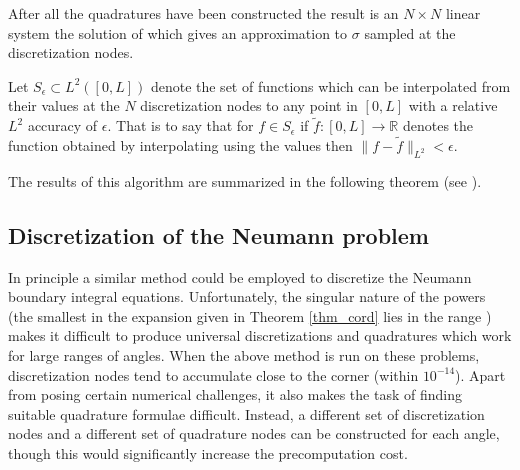 After all the quadratures have been constructed the result is an $N \times N$ linear system the  solution of which gives an approximation to $\sigma$ sampled at the discretization nodes. 

\begin{definition}\label{def:seps}
Let $S_\epsilon \subset L^2([0,L])$ denote the set of functions which can be interpolated from their values at the $N$ discretization nodes to any point in $[0,L]$ with a relative $L^2$ accuracy of $\epsilon.$ That is to say that for $f \in S_\epsilon$ if $\tilde{f}:[0,L] \to \mathbb{R}$ denotes the function obtained by interpolating using the values  then $\|f -\tilde{f}\|_{L^2} < \epsilon.$ 
\end{definition}

The results of this algorithm are summarized in the following theorem (see \cite{hoskins2019numerical}).


\subsection{Discretization of the Neumann problem}
In principle a similar method could be employed to discretize the Neumann boundary integral equations. Unfortunately, the singular nature of the powers (the smallest in the expansion given in Theorem \ref{thm_cord} lies in the range ) makes it difficult to produce universal discretizations and quadratures which work for large ranges of angles. When the above method is run on these problems, discretization nodes tend to accumulate close to the corner (within $10^{-14}$). Apart from posing certain numerical challenges, it also makes the task of finding suitable quadrature formulae difficult. Instead, a different set of discretization nodes and a different set of quadrature nodes can be constructed for each angle, though this would significantly increase the precomputation cost.

